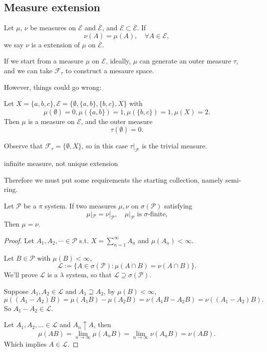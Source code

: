 \subsection{Measure extension}
\label{sub:Measure extension}
\begin{definition}
	Let $\mu$,  $\nu$ be measures on $\mathscr{E}$ and $\overline{\mathscr{E}}$,
	and $\mathscr{E}\subset\overline{\mathscr{E}}$. If
	\[
	\nu(A) = \mu(A) , \quad \forall A\in \mathscr{E},
	\]
	we say $\nu$ is a extension of  $\mu$ on $\overline{\mathscr{E}}$.
\end{definition}

If we start from a measure $\mu$ on  $\mathscr{E}$,
ideally, $\mu$ can generate an outer measure  $\tau$, and we can take
$\mathscr{F}_\tau$ to construct a mesaure space.

However, things could go wrong:
\begin{example}
    Let $X=\{a,b,c\}, \mathscr{E}=\{\emptyset, \{a,b\}, \{b,c\}, X\}$ with
	\[
	\mu(\emptyset)=0, \mu(\{a,b\})=1, \mu(\{b,c\})=1, \mu(X)=2.
	\]
	Then $\mu$ is a measure on  $\mathscr{E}$, and the outer measure
	\[
	\tau(\emptyset) = 0.
	\]

	Observe that $\mathscr{F}_\tau=\{\emptyset, X\}$, so in this case
	$\tau|_{\mathscr{F}}$ is the trivial measure.
\end{example}
\begin{example}
    infinite measure, not unique extension
\end{example}

Therefore we must put some requirements the starting collection,
namely semi-ring.

\begin{proposition}
	Let $ \mathscr{P}$ be a $\pi$ system. If two measures $\mu,\nu$
	on $\sigma(\mathscr{P})$ satisfying
	\[
	\mu|_{\mathscr{P}} = \nu|_{\mathscr{P}}, \quad \mu|_{\mathscr{P}}
	\text{ is $\sigma$-finite,}
	\]
	Then  $\mu = \nu$.
\end{proposition}
\begin{proof}[Proof]
    Let $A_1,A_2,\cdots\in \mathscr{P}$ s.t. $X = \sum_{n=1}^\infty A_n$ and
	$\mu(A_n)<\infty$.

	Let $B\in \mathscr{P}$ with $\mu(B)<\infty$,
	\[
	\mathscr{L} := \{A\in \sigma(\mathscr{P}): \mu(A\cap B) = \nu(A\cap B)\}.
	\]
	We'll prove $\mathscr{L}$ is a $\lambda$ system,
	so that $\mathscr{L}\supseteq \sigma(\mathscr{P})$.

	Suppose $A_1,A_2\in \mathscr{L}$ and $A_1\supseteq A_2$, by $\mu(B)<\infty$,
	\[
	\mu((A_1-A_2)B) = \mu(A_1B) - \mu(A_2B)
	= \nu(A_1B-A_2B) = \nu((A_1-A_2)B).
	\]
	So $A_1-A_2\in \mathscr{L}$.

	Let $A_1,A_2,\dots\in \mathscr{L}$ and $A_n\uparrow A$, then
	 \[
	\mu(AB) = \lim_{n\to \infty}\mu(A_nB) = \lim_{n\to \infty}\nu(A_n B) = \nu(AB).
	\]
	Which implies $A\in \mathscr{L}$.
\end{proof}
